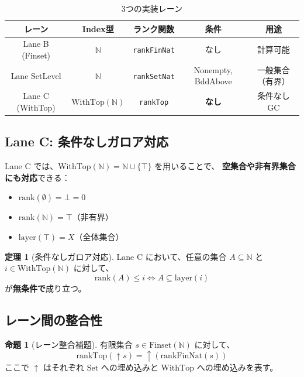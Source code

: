 \documentclass[a4paper,11pt]{ltjsarticle}
\theoremstyle{definition}
\newtheorem{theorem}[definition]{定理}
\newtheorem{proposition}[definition]{命題}
\newcommand{\N}{\mathbb{N}}
\newcommand{\layer}{\mathrm{layer}}
\newcommand{\rank}{\mathrm{rank}}
\newcommand{\Set}{\mathrm{Set}}
\newcommand{\Finset}{\mathrm{Finset}}
\newcommand{\WithTop}{\mathrm{WithTop}}
\begin{document}
\begin{table}[htbp]
\centering
\begin{tabular}{|c|c|c|c|c|}
\hline
\textbf{レーン} & \textbf{Index型} & \textbf{ランク関数} & \textbf{条件} & \textbf{用途} \\
\hline
Lane B (Finset) & $\N$ & \texttt{rankFinNat} & なし & 計算可能 \\
\hline
Lane SetLevel & $\N$ & \texttt{rankSetNat} & Nonempty, BddAbove & 一般集合（有界） \\
\hline
Lane C (WithTop) & $\WithTop(\N)$ & \texttt{rankTop} & \textbf{なし} & 条件なしGC \\
\hline
\end{tabular}
\caption{3つの実装レーン}
\label{tab:lanes}
\end{table}

\subsection{Lane C: 条件なしガロア対応}

Lane C では、$\WithTop(\N) = \N \cup \{\top\}$ を用いることで、
\textbf{空集合や非有界集合にも対応}できる：

\begin{itemize}
  \item $\rank(\emptyset) = \bot = 0$
  \item $\rank(\N) = \top$（非有界）
  \item $\layer(\top) = X$（全体集合）
\end{itemize}

\begin{theorem}[条件なしガロア対応]
Lane C において、任意の集合 $A \subseteq \N$ と $i \in \WithTop(\N)$ に対して、
\[
  \rank(A) \le i \iff A \subseteq \layer(i)
\]
が\textbf{無条件で}成り立つ。
\end{theorem}

\subsection{レーン間の整合性}

\begin{proposition}[レーン整合補題]
有限集合 $s \in \Finset(\N)$ に対して、
\[
  \mathrm{rankTop}(\uparrow s) = \uparrow(\mathrm{rankFinNat}(s))
\]
ここで $\uparrow$ はそれぞれ $\Set$ への埋め込みと $\WithTop$ への埋め込みを表す。
\end{proposition}

\end{document}
